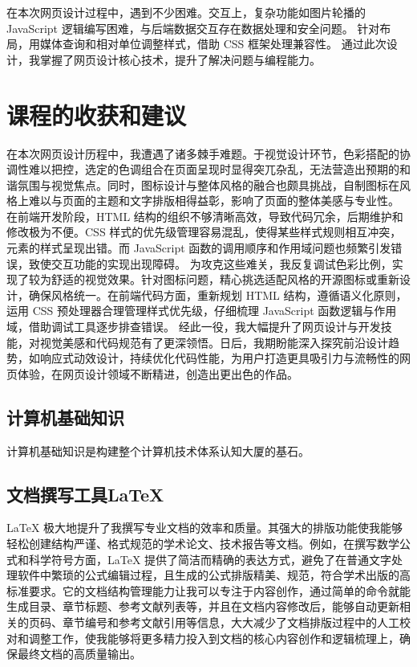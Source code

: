 \documentclass[supercite]{Experimental_Report}
\theoremstyle{definition}
\begin{document}
在本次网页设计过程中，遇到不少困难。交互上，复杂功能如图片轮播的 JavaScript 逻辑编写困难，与后端数据交互存在数据处理和安全问题。
针对布局，用媒体查询和相对单位调整样式，借助 CSS 框架处理兼容性。
通过此次设计，我掌握了网页设计核心技术，提升了解决问题与编程能力。

\newpage

\section{课程的收获和建议}

在本次网页设计历程中，我遭遇了诸多棘手难题。于视觉设计环节，色彩搭配的协调性难以把控，选定的色调组合在页面呈现时显得突兀杂乱，无法营造出预期的和谐氛围与视觉焦点。同时，图标设计与整体风格的融合也颇具挑战，自制图标在风格上难以与页面的主题和文字排版相得益彰，影响了页面的整体美感与专业性。
在前端开发阶段，HTML 结构的组织不够清晰高效，导致代码冗余，后期维护和修改极为不便。CSS 样式的优先级管理容易混乱，使得某些样式规则相互冲突，元素的样式呈现出错。而 JavaScript 函数的调用顺序和作用域问题也频繁引发错误，致使交互功能的实现出现障碍。
为攻克这些难关，我反复调试色彩比例，实现了较为舒适的视觉效果。针对图标问题，精心挑选适配风格的开源图标或重新设计，确保风格统一。在前端代码方面，重新规划 HTML 结构，遵循语义化原则，运用 CSS 预处理器合理管理样式优先级，仔细梳理 JavaScript 函数逻辑与作用域，借助调试工具逐步排查错误。
经此一役，我大幅提升了网页设计与开发技能，对视觉美感和代码规范有了更深领悟。日后，我期盼能深入探究前沿设计趋势，如响应式动效设计，持续优化代码性能，为用户打造更具吸引力与流畅性的网页体验，在网页设计领域不断精进，创造出更出色的作品。


\subsection{计算机基础知识}
计算机基础知识是构建整个计算机技术体系认知大厦的基石。


\subsection{文档撰写工具LaTeX}

LaTeX 极大地提升了我撰写专业文档的效率和质量。其强大的排版功能使我能够轻松创建结构严谨、格式规范的学术论文、技术报告等文档。例如，在撰写数学公式和科学符号方面，LaTeX 提供了简洁而精确的表达方式，避免了在普通文字处理软件中繁琐的公式编辑过程，且生成的公式排版精美、规范，符合学术出版的高标准要求。它的文档结构管理能力让我可以专注于内容创作，通过简单的命令就能生成目录、章节标题、参考文献列表等，并且在文档内容修改后，能够自动更新相关的页码、章节编号和参考文献引用等信息，大大减少了文档排版过程中的人工校对和调整工作，使我能够将更多精力投入到文档的核心内容创作和逻辑梳理上，确保最终文档的高质量输出。
\end{document}
